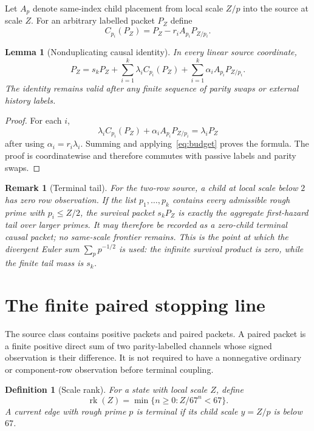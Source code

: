 \documentclass[11pt]{article}
\newtheorem{lemma}[theorem]{Lemma}
\newtheorem{definition}[theorem]{Definition}
\newtheorem{remark}[theorem]{Remark}
\newcommand{\rk}{\operatorname{rk}}
\begin{document}
Let $A_p$ denote same-index child placement from local scale $Z/p$ into the source at scale $Z$.  For an arbitrary labelled packet $P_Z$ define
\[
 C_{p_i}(P_Z)=P_Z-r_iA_{p_i}P_{Z/p_i}.
\]

\begin{lemma}[Nonduplicating causal identity]
\label{lem:causal}
In every linear source coordinate,
\begin{equation}
 P_Z=s_kP_Z+
 \sum_{i=1}^k\lambda_i C_{p_i}(P_Z)
 +\sum_{i=1}^k\alpha_iA_{p_i}P_{Z/p_i}.
\label{eq:causalidentity}
\end{equation}
The identity remains valid after any finite sequence of parity swaps or external history labels.
\end{lemma}
\begin{proof}
For each $i$,
\[
 \lambda_iC_{p_i}(P_Z)+\alpha_iA_{p_i}P_{Z/p_i}
 =\lambda_iP_Z
\]
after using $\alpha_i=r_i\lambda_i$.  Summing and applying~\eqref{eq:budget} proves the formula.  The proof is coordinatewise and therefore commutes with passive labels and parity swaps.
\end{proof}

\begin{remark}[Terminal tail]
For the two-row source, a child at local scale below $2$ has zero row observation.  If the list $p_1,\dots,p_k$ contains every admissible rough prime with $p_i\le Z/2$, the survival packet $s_kP_Z$ is exactly the aggregate first-hazard tail over larger primes.  It may therefore be recorded as a zero-child terminal causal packet; no same-scale frontier remains.  This is the point at which the divergent Euler sum $\sum_p p^{-1/2}$ is used: the infinite survival product is zero, while the finite tail mass is $s_k$.
\end{remark}

\section{The finite paired stopping line}
\label{sec:stopping}

The source class contains positive packets and paired packets.  A paired packet is a finite positive direct sum of two parity-labelled channels whose signed observation is their difference.  It is not required to have a nonnegative ordinary or component-row observation before terminal coupling.

\begin{definition}[Scale rank]
For a state with local scale $Z$, define
\begin{equation}
 \rk(Z)=\min\{n\ge0:Z/67^n<67\}.
\label{eq:rank}
\end{equation}
A current edge with rough prime $p$ is terminal if its child scale $y=Z/p$ is below $67$.
\end{definition}
\end{document}
